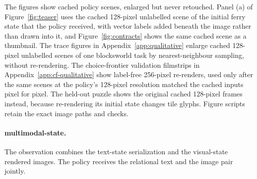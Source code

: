The figures show cached policy scenes, enlarged but never retouched. Panel (a) of Figure~\ref{fig:teaser} uses the cached 128-pixel unlabelled scene of the initial ferry state that the policy received, with vector labels added beneath the image rather than drawn into it, and Figure~\ref{fig:contracts} shows the same cached scene as a thumbnail. The trace figures in Appendix~\ref{app:qualitative} enlarge cached 128-pixel unlabelled scenes of one blocksworld task by nearest-neighbour sampling, without re-rendering. The choice-frontier validation filmstrips in Appendix~\ref{app:cf-qualitative} show label-free 256-pixel re-renders, used only after the same scenes at the policy's 128-pixel resolution matched the cached inputs pixel for pixel. The held-out puzzle shows the original cached 128-pixel frames instead, because re-rendering its initial state changes tile glyphs. Figure scripts retain the exact image paths and checks.

\paragraph{multimodal-state.}
The observation combines the text-state serialization and the visual-state rendered images. The policy receives the relational text and the image pair jointly.




